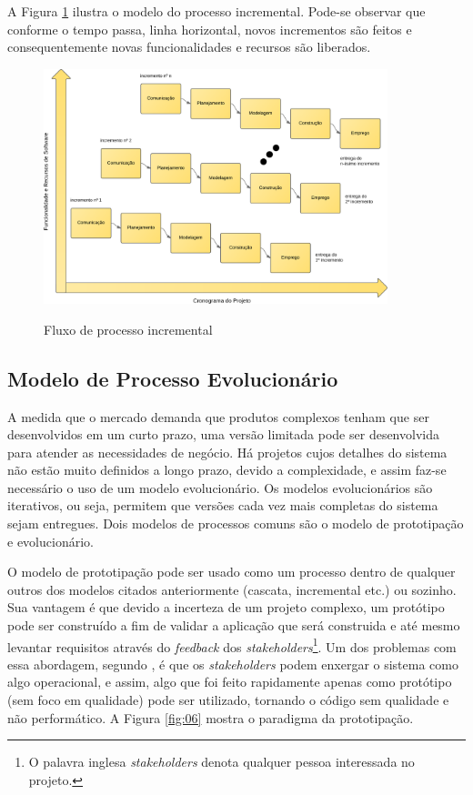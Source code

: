 A Figura \ref{fig:05} ilustra o modelo do processo incremental. Pode-se observar que conforme o tempo passa, linha horizontal, novos incrementos são feitos e consequentemente novas funcionalidades e recursos são liberados.

\begin{figure}[htb!]
\begin{center}
\caption{Fluxo de processo incremental}
\label{fig:05}
\includegraphics[width=10cm]{assets/incremental} \\
\end{center}
\end{figure}

\subsection{Modelo de Processo Evolucionário}
\label{sec:espiral}
A medida que o mercado demanda que produtos complexos tenham que ser desenvolvidos em um curto prazo, uma versão limitada pode ser desenvolvida para atender as necessidades de negócio. Há projetos cujos detalhes do sistema não estão muito definidos a longo prazo, devido a complexidade, e assim faz-se necessário o uso de um modelo evolucionário. Os modelos evolucionários são iterativos, ou seja, permitem que versões cada vez mais completas do sistema sejam entregues. Dois modelos de processos comuns são o modelo de prototipação e evolucionário. 

O modelo de prototipação pode ser usado como um processo dentro de qualquer outros dos modelos citados anteriormente (cascata, incremental etc.) ou sozinho. Sua vantagem é que devido a incerteza de um projeto complexo, um protótipo pode ser construído a fim de validar a aplicação que será construida e até mesmo levantar requisitos através do \textit{feedback} dos \textit{stakeholders}\footnote{O palavra inglesa \textit{stakeholders} denota qualquer pessoa interessada no projeto.}. Um dos problemas com essa abordagem, segundo , é que os \textit{stakeholders} podem enxergar o sistema como algo operacional, e assim, algo que foi feito rapidamente apenas como protótipo (sem foco em qualidade) pode ser utilizado, tornando o código sem qualidade e não performático. A Figura \ref{fig:06} mostra o paradigma da prototipação.


